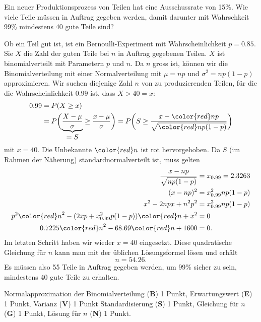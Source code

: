 Ein neuer Produktionsprozess von Teilen hat eine Ausschussrate von 15\%.
Wie viele Teile müssen in Auftrag gegeben werden, damit darunter
mit Wahrschkeit 99\% mindestens 40 gute Teile sind?



\begin{loesung}
Ob ein Teil gut ist, ist ein Bernoulli-Experiment mit Wahrscheinlichkeit
$p=0.85$.
Sie $X$ die Zahl der guten Teile bei $n$ in Auftrag gegebenen Teilen.
$X$ ist binomialverteilt mit Parametern $p$ und $n$.
Da $n$ gross ist, können wir die Binomialverteilung mit einer
Normalverteilung mit $\mu=np$ und $\sigma^2=np(1-p)$ approximieren.
Wir suchen diejenige Zahl $n$ von zu produzierenden Teilen, für
die die Wahrscheinlichkeit $0.99$ ist, dass $X>40 =x$:
\begin{align*}
0.99
&=
P(X\ge x)\\
&=
P\biggl(\underbrace{\frac{X-\mu}{\sigma}}_{\displaystyle=S}\ge \frac{x-\mu}{\sigma}\biggr)
=
P\biggl(S\ge \frac{x-{\color{red}n}p}{\sqrt{{\color{red}n}p(1-p)}}\biggr)
\end{align*}
mit $x=40$.
Die Unbekannte $\color{red}n$ ist rot hervorgehoben.
Da $S$ (im Rahmen der Näherung) standardnormalverteilt ist, muss
gelten
\begin{align*}
\frac{x-np}{\sqrt{np(1-p)}}
&=
x_{0.99}=2.3263
\\
(x-np)^2
&=
x_{0.99}^2np(1-p)
\\
x^2-2npx+n^2p^2
&=
x_{0.99}^2np(1-p)
\\
p^2{\color{red}n}^2
-
(2xp+x_{0.99}^2p(1-p)) {\color{red}n}
+
x^2
&=0
\\
0.7225 {\color{red}n}^2 -68.69 {\color{red}n} + 1600
&= 
0.
\end{align*}
Im letzten Schritt haben wir wieder $x=40$ eingesetzt.
Diese quadratische Gleichung für $n$ kann man mit der üblichen
Lösungsformel lösen und erhält
\[
n=54.26.
\]
Es müssen also 55 Teile in Auftrag gegeben werden, um 99\% sicher zu sein,
mindestens 40 gute Teile zu erhalten.
\end{loesung}

\begin{bewertung}
Normalapproximation der Binomialverteilung ({\bf B}) 1 Punkt,
Erwartungswert ({\bf E}) 1 Punkt,
Varianz ({\bf V}) 1 Punkt
Standardisierung ({\bf S}) 1 Punkt,
Gleichung für $n$ ({\bf G}) 1 Punkt,
Lösung für $n$ ({\bf N}) 1 Punkt.
\end{bewertung}

